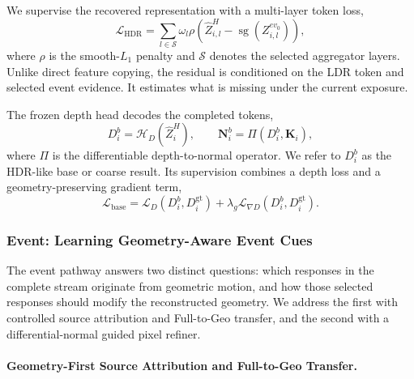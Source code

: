 We supervise the recovered representation with a multi-layer token loss,
\begin{equation}
    \mathcal L_{\mathrm{HDR}}
    =\sum_{l\in\mathcal S}\omega_l
    \rho\!\left(\widehat Z_{i,l}^{H}
    -\operatorname{sg}(Z_{i,l}^{ev_0})\right),
\end{equation}
where $\rho$ is the smooth-$L_1$ penalty and $\mathcal S$ denotes the selected
aggregator layers. Unlike direct feature copying, the residual is conditioned
on the LDR token and selected event evidence. It estimates what is missing
under the current exposure.

The frozen depth head decodes the completed tokens,
\begin{equation}
    D_i^{b}=\mathcal H_D(\widehat Z_i^{H}),
    \qquad
    \bm N_i^{b}=\Pi(D_i^{b},\bm K_i),
\end{equation}
where $\Pi$ is the differentiable depth-to-normal operator. We refer to
$D_i^{b}$ as the HDR-like base or coarse result. Its supervision combines a
depth loss and a geometry-preserving gradient term,
\begin{equation}
    \mathcal L_{\mathrm{base}}
    =\mathcal L_D(D_i^{b},D_i^{\mathrm{gt}})
    +\lambda_g\mathcal L_{\nabla D}(D_i^{b},D_i^{\mathrm{gt}}).
\end{equation}

\subsubsection{Event: Learning Geometry-Aware Event Cues}
\label{sec:event_path}

The event pathway answers two distinct questions: which responses in the
complete stream originate from geometric motion, and how those selected
responses should modify the reconstructed geometry. We address the first with
controlled source attribution and Full-to-Geo transfer, and the second with a
differential-normal guided pixel refiner.

\paragraph{Geometry-First Source Attribution and Full-to-Geo Transfer.}
\label{sec:controlled_event_attribution}


